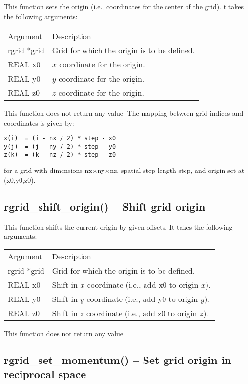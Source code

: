 \documentclass[12pt,letterpaper]{report}
\begin{document}
This function sets the origin (i.e., coordinates for the center of the grid). t takes the following arguments:
\begin{longtable}{p{} p{}}
Argument & Description\\
\cline{1-2}
rgrid *grid & Grid for which the origin is to be defined.\\
REAL x0 & $x$ coordinate for the origin.\\
REAL y0 & $y$ coordinate for the origin.\\
REAL z0 & $z$ coordinate for the origin.\\
\end{longtable}
\noindent
This function does not return any value. The mapping between grid indices and coordinates is given by:
\begin{verbatim}
x(i)  = (i - nx / 2) * step - x0
y(j)  = (j - ny / 2) * step - y0
z(k)  = (k - nz / 2) * step - z0
\end{verbatim}
for a grid with dimensions nx$\times$ny$\times$nz, spatial step length step, and origin set at (x0,y0,z0).

\subsection{rgrid\_shift\_origin() -- Shift grid origin}

This function shifts the current origin by given offsets. It takes the following arguments:
\begin{longtable}{p{} p{}}
Argument & Description\\
\cline{1-2}
rgrid *grid & Grid for which the origin is to be defined.\\
REAL x0 & Shift in $x$ coordinate (i.e., add x0 to origin $x$).\\
REAL y0 & Shift in $y$ coordinate (i.e., add y0 to origin $y$).\\
REAL z0 & Shift in $z$ coordinate (i.e., add z0 to origin $z$).\\
\end{longtable}
\noindent
This function does not return any value.

\subsection{rgrid\_set\_momentum() -- Set grid origin in reciprocal space}
\end{document}
